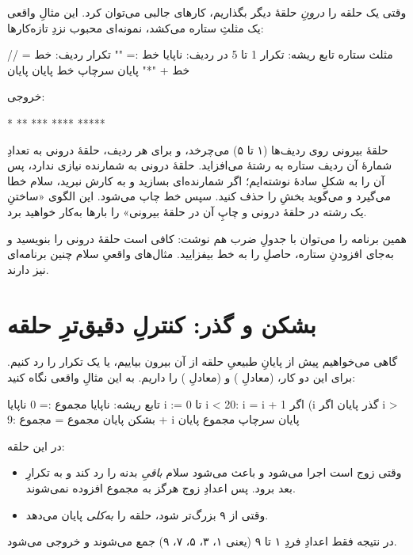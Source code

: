 وقتی یک حلقه را \emph{درونِ} حلقهٔ دیگر بگذاریم، کارهای جالبی می‌توان کرد. این
مثالِ واقعی یک مثلثِ ستاره می‌کشد، نمونه‌ای محبوب نزدِ تازه‌کارها:

\begin{salamfa}
// مثلث ستاره
تابع ریشه:
    تکرار 1 تا 5 در ردیف:
        ناپایا خط := ""
        تکرار ردیف:
            خط = خط + "*"
        پایان
        سرچاپ خط
    پایان
پایان
\end{salamfa}

خروجی:

\begin{salamen}[language={}]
*
**
***
****
*****
\end{salamen}

حلقهٔ بیرونی روی ردیف‌ها (۱ تا ۵) می‌چرخد، و برای هر ردیف، حلقهٔ درونی به تعدادِ
شمارهٔ آن ردیف ستاره به رشتهٔ  می‌افزاید. حلقهٔ درونی به شمارنده نیازی
ندارد، پس آن را به شکلِ سادهٔ  نوشته‌ایم؛ اگر شمارنده‌ای
بسازید و به کارش نبرید، سلام خطا می‌گیرد و می‌گوید بخشِ  را حذف
کنید. سپس خط چاپ می‌شود. این الگوی
«ساختنِ یک رشته در حلقهٔ درونی و چاپِ آن در حلقهٔ بیرونی» را بارها به‌کار خواهید
برد.

\begin{tip}
همین برنامه را می‌توان با جدولِ ضرب هم نوشت: کافی است حلقهٔ درونی را
 بنویسید و به‌جای افزودنِ ستاره، حاصلِ
 را به خط بیفزایید. مثال‌های واقعیِ سلام چنین برنامه‌ای
نیز دارند.
\end{tip}

\section{بشکن و گذر: کنترلِ دقیق‌ترِ حلقه}

گاهی می‌خواهیم پیش از پایانِ طبیعیِ حلقه از آن بیرون بیاییم، یا یک تکرار را رد
کنیم. برای این دو کار،  (معادلِ ) و 
(معادلِ ) را داریم. به این مثالِ واقعی نگاه کنید:

\begin{salamfa}
تابع ریشه:
    ناپایا مجموع := 0
    ناپایا i := 0
    تا i < 20:
        i = i + 1
        اگر (i %
            گذر
        پایان
        اگر i > 9:
            بشکن
        پایان
        مجموع = مجموع + i
    پایان
    سرچاپ مجموع
پایان
\end{salamfa}

در این حلقه:
\begin{itemize}
  \item {} وقتی  زوج است اجرا می‌شود و باعث می‌شود سلام
        \emph{باقیِ} بدنه را رد کند و به تکرارِ بعد برود. پس اعدادِ زوج هرگز به
        مجموع افزوده نمی‌شوند.
  \item {} وقتی  از ۹ بزرگ‌تر شود، حلقه را \emph{به‌کلی}
        پایان می‌دهد.
\end{itemize}
در نتیجه فقط اعدادِ فردِ ۱ تا ۹ (یعنی ۱، ۳، ۵، ۷، ۹) جمع می‌شوند و خروجی
 می‌شود.

